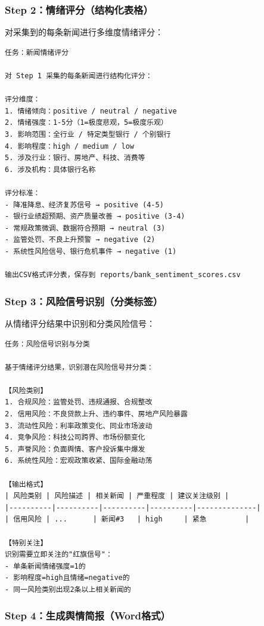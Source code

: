 \subsubsection{Step 2：情绪评分（结构化表格）}

对采集到的每条新闻进行多维度情绪评分：

\begin{lstlisting}
任务：新闻情绪评分

对 Step 1 采集的每条新闻进行结构化评分：

评分维度：
1. 情绪倾向：positive / neutral / negative
2. 情绪强度：1-5分（1=极度悲观，5=极度乐观）
3. 影响范围：全行业 / 特定类型银行 / 个别银行
4. 影响程度：high / medium / low
5. 涉及行业：银行、房地产、科技、消费等
6. 涉及机构：具体银行名称

评分标准：
- 降准降息、经济复苏信号 → positive (4-5)
- 银行业绩超预期、资产质量改善 → positive (3-4)
- 常规政策微调、数据符合预期 → neutral (3)
- 监管处罚、不良上升预警 → negative (2)
- 系统性风险信号、银行危机事件 → negative (1)

输出CSV格式评分表，保存到 reports/bank_sentiment_scores.csv
\end{lstlisting}

\subsubsection{Step 3：风险信号识别（分类标签）}

从情绪评分结果中识别和分类风险信号：

\begin{lstlisting}
任务：风险信号识别与分类

基于情绪评分结果，识别潜在风险信号并分类：

【风险类别】
1. 合规风险：监管处罚、违规通报、合规整改
2. 信用风险：不良贷款上升、违约事件、房地产风险暴露
3. 流动性风险：利率政策变化、同业市场波动
4. 竞争风险：科技公司跨界、市场份额变化
5. 声誉风险：负面舆情、客户投诉集中爆发
6. 系统性风险：宏观政策收紧、国际金融动荡

【输出格式】
| 风险类别 | 风险描述 | 相关新闻 | 严重程度 | 建议关注级别 |
|----------|----------|----------|----------|--------------|
| 信用风险 | ...      | 新闻#3   | high     | 紧急         |

【特别关注】
识别需要立即关注的"红旗信号"：
- 单条新闻情绪强度=1的
- 影响程度=high且情绪=negative的
- 同一风险类别出现2条以上相关新闻的
\end{lstlisting}

\subsubsection{Step 4：生成舆情简报（Word格式）}

